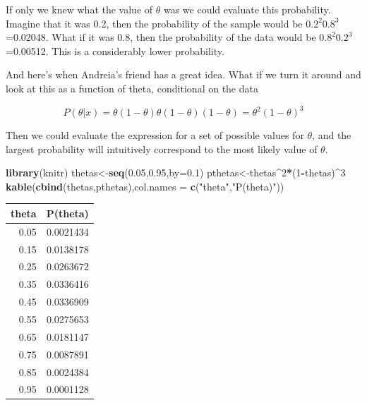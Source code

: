 \documentclass[
]{book}
\newenvironment{Shaded}{\begin{snugshade}}{\end{snugshade}}
\newcommand{\AttributeTok}[1]{\textcolor[rgb]{0.13,0.29,0.53}{#1}}
\newcommand{\DecValTok}[1]{\textcolor[rgb]{0.00,0.00,0.81}{#1}}
\newcommand{\FloatTok}[1]{\textcolor[rgb]{0.00,0.00,0.81}{#1}}
\newcommand{\FunctionTok}[1]{\textcolor[rgb]{0.13,0.29,0.53}{\textbf{#1}}}
\newcommand{\NormalTok}[1]{#1}
\newcommand{\OtherTok}[1]{\textcolor[rgb]{0.56,0.35,0.01}{#1}}
\newcommand{\SpecialCharTok}[1]{\textcolor[rgb]{0.81,0.36,0.00}{\textbf{#1}}}
\newcommand{\StringTok}[1]{\textcolor[rgb]{0.31,0.60,0.02}{#1}}
\begin{document}
If only we knew what the value of \(\theta\) was we could evaluate this probability. Imagine that it was 0.2, then the probability of the sample would be \(0.2^2 0.8^3\)=0.02048. What if it was 0.8, then the probability of the data would be \(0.8^2 0.2^3\)=0.00512. This is a considerably lower probability.

And here's when Andreia's friend has a great idea. What if we turn it around and look at this as a function of theta, conditional on the data

\[P(\theta|x)=\theta (1-\theta)  \theta (1-\theta) (1-\theta)=\theta^2 (1-\theta)^3\]

Then we could evaluate the expression for a set of possible values for \(\theta\), and the largest probability will intuitively correspond to the most likely value of \(\theta\).

\begin{Shaded}
\begin{Highlighting}[]
\FunctionTok{library}\NormalTok{(knitr)}
\NormalTok{thetas}\OtherTok{\textless{}{-}}\FunctionTok{seq}\NormalTok{(}\FloatTok{0.05}\NormalTok{,}\FloatTok{0.95}\NormalTok{,}\AttributeTok{by=}\FloatTok{0.1}\NormalTok{)}
\NormalTok{pthetas}\OtherTok{\textless{}{-}}\NormalTok{thetas}\SpecialCharTok{\^{}}\DecValTok{2}\SpecialCharTok{*}\NormalTok{(}\DecValTok{1}\SpecialCharTok{{-}}\NormalTok{thetas)}\SpecialCharTok{\^{}}\DecValTok{3}
\FunctionTok{kable}\NormalTok{(}\FunctionTok{cbind}\NormalTok{(thetas,pthetas),}\AttributeTok{col.names =} \FunctionTok{c}\NormalTok{(}\StringTok{"theta"}\NormalTok{,}\StringTok{"P(theta)"}\NormalTok{))}
\end{Highlighting}
\end{Shaded}

\begin{tabular}{r|r}
\hline
theta & P(theta)\\
\hline
0.05 & 0.0021434\\
\hline
0.15 & 0.0138178\\
\hline
0.25 & 0.0263672\\
\hline
0.35 & 0.0336416\\
\hline
0.45 & 0.0336909\\
\hline
0.55 & 0.0275653\\
\hline
0.65 & 0.0181147\\
\hline
0.75 & 0.0087891\\
\hline
0.85 & 0.0024384\\
\hline
0.95 & 0.0001128\\
\hline
\end{tabular}
\end{document}
